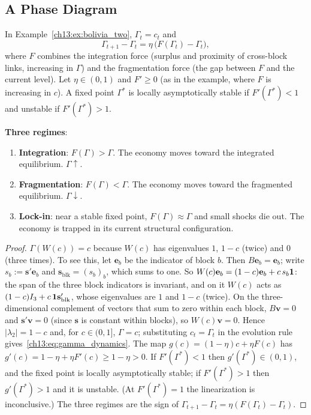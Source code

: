 \documentclass[../structural_economics_book.tex]{subfiles}
\begin{document}
\subsection{A Phase Diagram}

\begin{proposition}\label{ch13:prop:phase}
In Example~\ref{ch13:ex:bolivia_two}, $\Gamma_t = c_t$ and
\begin{equation}\label{ch13:eq:gamma_dynamics}
\Gamma_{t+1} - \Gamma_t = \eta\,\big(F(\Gamma_t) - \Gamma_t\big),
\end{equation}
where $F$ combines the integration force (surplus and proximity of cross-block links, increasing in $\Gamma$) and the fragmentation force (the gap between $F$ and the current level). Let $\eta \in (0,1)$ and $F' \geq 0$ (as in the example, where $F$ is increasing in $c$). A fixed point $\Gamma^*$ is locally asymptotically stable if $F'(\Gamma^*) < 1$ and unstable if $F'(\Gamma^*) > 1$.

\textbf{Three regimes}:
\begin{enumerate}
\item \textbf{Integration}: $F(\Gamma) > \Gamma$. The economy moves toward the integrated equilibrium. $\Gamma \uparrow$.
\item \textbf{Fragmentation}: $F(\Gamma) < \Gamma$. The economy moves toward the fragmented equilibrium. $\Gamma \downarrow$.
\item \textbf{Lock-in}: near a stable fixed point, $F(\Gamma) \approx \Gamma$ and small shocks die out. The economy is trapped in its current structural configuration.
\end{enumerate}
\end{proposition}

\begin{proof}
$\Gamma(W(c)) = c$ because $W(c)$ has eigenvalues $1$, $1-c$ (twice) and $0$ (three times). To see this, let $\mathbf{e}_b$ be the indicator of block $b$. Then $B\mathbf{e}_b = \mathbf{e}_b$; write $s_b := \mathbf{s}'\mathbf{e}_b$ and $\mathbf{s}_{\text{blk}} = (s_b)_b$, which sums to one. So $W(c)\mathbf{e}_b = (1-c)\mathbf{e}_b + c\, s_b \mathbf{1}$: the span of the three block indicators is invariant, and on it $W(c)$ acts as $(1-c)I_3 + c\,\mathbf{1}\mathbf{s}_{\text{blk}}'$, whose eigenvalues are $1$ and $1-c$ (twice). On the three-dimensional complement of vectors that sum to zero within each block, $B\mathbf{v} = 0$ and $\mathbf{s}'\mathbf{v} = 0$ (since $\mathbf{s}$ is constant within blocks), so $W(c)\mathbf{v} = 0$. Hence $|\lambda_2| = 1 - c$ and, for $c \in (0,1]$, $\Gamma = c$; substituting $c_t = \Gamma_t$ in the evolution rule gives~\eqref{ch13:eq:gamma_dynamics}. The map $g(c) = (1-\eta)c + \eta F(c)$ has $g'(c) = 1 - \eta + \eta F'(c) \geq 1 - \eta > 0$. If $F'(\Gamma^*) < 1$ then $g'(\Gamma^*) \in (0,1)$, and the fixed point is locally asymptotically stable; if $F'(\Gamma^*) > 1$ then $g'(\Gamma^*) > 1$ and it is unstable. (At $F'(\Gamma^*) = 1$ the linearization is inconclusive.) The three regimes are the sign of $\Gamma_{t+1} - \Gamma_t = \eta(F(\Gamma_t) - \Gamma_t)$.
\end{proof}
\end{document}
